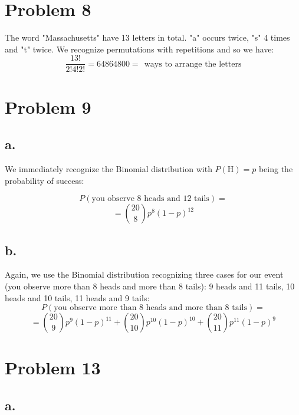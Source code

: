 \documentclass{article}
\begin{document}
\section*{Problem 8}
The word "Massachusetts" have 13 letters in total. "a" occurs twice, "s" 4 times and "t" twice.
We recognize permutations with repetitions and so we have:
\begin{equation*}
    \frac{13!}{2! 4! 2!} = 64864800 = \ \ \mbox{ways to arrange the letters}
\end{equation*}

\section*{Problem 9}
\subsection*{a.}
We immediately recognize the Binomial distribution with \(P(\mbox{H}) = p\) being
the probability of success:

\begin{equation*}
    P(\mbox{you observe 8 heads and 12 tails}) =
\end{equation*}
\begin{equation*}
    = \binom{20}{8} p^{8}(1- p)^{12}
\end{equation*}
\subsection*{b.}
Again, we use the Binomial distribution recognizing three cases for our event
(you observe more than 8 heads and more than 8 tails): 9 heads and 11 tails,
10 heads and 10 tails, 11 heads and 9 tails:
\begin{equation*}
    P(\mbox{you observe more than 8 heads and more than 8 tails}) = 
\end{equation*}
\begin{equation*}
    = \binom{20}{9}p^{9}(1-p)^{11} + \binom{20}{10}p^{10}(1-p)^{10} + \binom{20}{11}p^{11}(1-p)^{9}
\end{equation*}

\section*{Problem 13}
\subsection*{a.}
\end{document}
